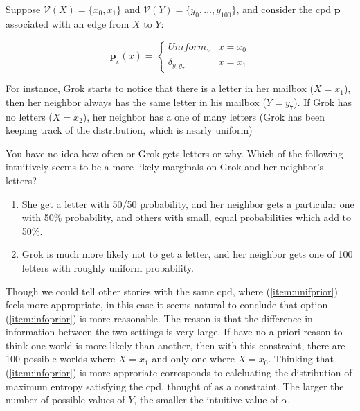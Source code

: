 \documentclass{article}
\theoremstyle{plain}
\theoremstyle{definition}
\newenvironment{example}
	{\pushQED{\qed}\renewcommand{\qedsymbol}{$\triangle$}\examplex}
	{\popQED\endexamplex%
}
\theoremstyle{remark}
\newcommand\mat[1]{\mathbf{#1}}
\newcommand{\bp}[1][L]{\mat{p}_{\!_{#1}\!}}
\newcommand{\V}{\mathcal V}
\numberwithin{equation}{section}
\begin{document}
{	\begin{example}\label{ex:alpha-motivation}
		Suppose $\V(X) = \{x_0, x_1\}$ and $\V(Y) = \{y_0,
                \ldots, y_{100}\}$, and consider the cpd $\mat p$
                associated with an edge from $X$ to $Y$: 
		
		\begin{equation}
			\bp(x) = \begin{cases}
				\mathit{Uniform}_Y & x = x_0 \\
				\delta_{y, y_7} & x = x_1
			\end{cases}
		\end{equation}

		For instance, Grok starts to notice that there is a letter in her mailbox ($X = x_1$), then her neighbor always has the same letter in his mailbox ($Y = y_7$). If Grok has no letters ($X = x_2$), her neighbor has a one of many letters (Grok has been keeping track of the distribution, which is nearly uniform)
		
		You have no idea how often or Grok gets letters or why. Which of the following intuitively seems to be a more likely marginals on Grok and her neighbor's letters?
		
		\begin{enumerate}
			\item She get a letter with 50/50 probability, and her neighbor gets a particular one with 50\% probability, and others with small, equal probabilities which add to 50\%. \label{item:unifprior}
			\item Grok is much more likely not to get a letter, and her neighbor gets one of 100 letters with roughly uniform probability. \label{item:infoprior}
		\end{enumerate}
		 	
				
		Though we could tell other stories with the same cpd,
                where (\ref{item:unifprior}) feels more appropriate,
                in this case it seems natural to conclude that option
                (\ref{item:infoprior}) is more reasonable. The reason
                is that the difference in information between the two
                settings is very large. If have no a priori reason to
                think one world is more likely than another, then with
                this constraint, there are 100 possible worlds where
                 $X = x_1$ and only one where $X = x_0$. Thinking that
                (\ref{item:infoprior}) is more approriate corresponds
                to calcluating the distribution of maximum entropy
                satisfying the cpd, thought of as a constraint. The
                larger the number of possible values of $Y$, the
                smaller the intuitive value of $\alpha$. 


\end{example}}
\end{document}
